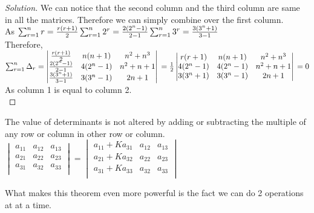 \begin{proof}
    [Solution]
    We can notice that the second column and the third column are same in all the matrices. Therefore we can simply combine over the first column.\\
    As $\sum^n_{r=1}r=\frac{r(r+1)}{2}\\
    \sum^n_{r=1}2^r=\frac{2(2^n-1)}{2-1}\\
    \sum^n_{r=1}3^r=\frac{3(3^n+1)}{3-1}$\\
    Therefore, $\sum^n_{r=1}\Delta_r= \begin{vmatrix}
    \frac{r(r+1)}{2} & n(n+1) & n^2+n^3 \\
    \frac{2(2^n-1)}{2-1} & 4(2^n-1) & n^2+n+1 \\
    \frac{3(3^n+1)}{3-1} & 3(3^n-1) & 2n+1 \\
\end{vmatrix}\\
= \frac{1}{2}\begin{vmatrix}
    r(r+1) & n(n+1) & n^2+n^3 \\
    4(2^n-1) & 4(2^n-1) & n^2+n+1 \\
    3(3^n+1) & 3(3^n-1) & 2n+1 \\
\end{vmatrix}\\
= 0$\\
As column 1 is equal to column 2.\\
\end{proof}
\begin{theorem}
    The value of determinants is not altered by adding or subtracting the multiple of any row or column in other row or column. \\
    $\begin{vmatrix}
    a_{11} & a_{12} & a_{13} \\
    a_{21} & a_{22} & a_{23} \\
    a_{31} & a_{32} & a_{33} \\
\end{vmatrix} = \begin{vmatrix}
    a_{11} + Ka_{31} & a_{12} & a_{13} \\
    a_{21} + Ka_{32} & a_{22} & a_{23} \\
    a_{31}+Ka_{33} & a_{32} & a_{33} \\
\end{vmatrix}$
\end{theorem}
What makes this theorem even more powerful is the fact we can do 2  operations at at a time.\\
